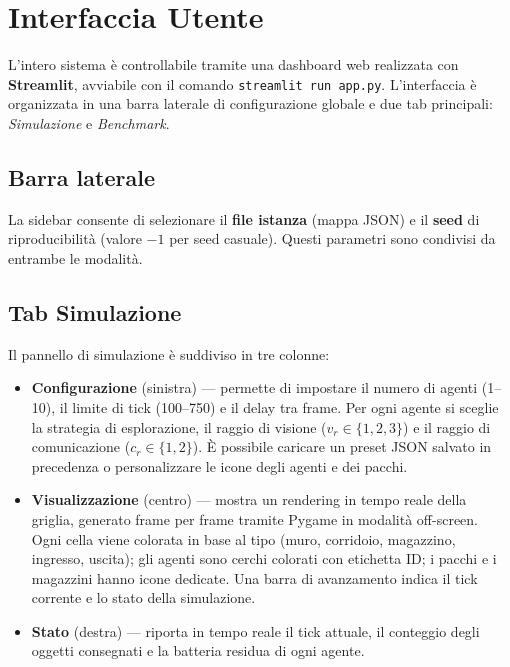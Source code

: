 \chapter{Interfaccia Utente}

L'intero sistema \`e controllabile tramite una dashboard web realizzata con
\textbf{Streamlit}, avviabile con il comando \texttt{streamlit run app.py}.
L'interfaccia \`e organizzata in una barra laterale di configurazione globale e
due tab principali: \textit{Simulazione} e \textit{Benchmark}.

\section{Barra laterale}

La sidebar consente di selezionare il \textbf{file istanza} (mappa JSON) e il
\textbf{seed} di riproducibilit\`a (valore $-1$ per seed casuale).
Questi parametri sono condivisi da entrambe le modalit\`a.

\section{Tab Simulazione}

Il pannello di simulazione \`e suddiviso in tre colonne:

\begin{itemize}
  \item \textbf{Configurazione} (sinistra) --- permette di impostare il numero di agenti
        (1--10), il limite di tick (100--750) e il delay tra frame.
        Per ogni agente si sceglie la strategia di esplorazione, il raggio di visione
        ($v_r \in \{1,2,3\}$) e il raggio di comunicazione ($c_r \in \{1,2\}$).
        \`E possibile caricare un preset JSON salvato in precedenza o
        personalizzare le icone degli agenti e dei pacchi.
  \item \textbf{Visualizzazione} (centro) --- mostra un rendering in tempo reale della
        griglia, generato frame per frame tramite Pygame in modalit\`a off-screen.
        Ogni cella viene colorata in base al tipo (muro, corridoio, magazzino, ingresso, uscita);
        gli agenti sono cerchi colorati con etichetta ID; i pacchi e i magazzini hanno icone
        dedicate.
        Una barra di avanzamento indica il tick corrente e lo stato della simulazione.
  \item \textbf{Stato} (destra) --- riporta in tempo reale il tick attuale, il conteggio
        degli oggetti consegnati e la batteria residua di ogni agente.
\end{itemize}

